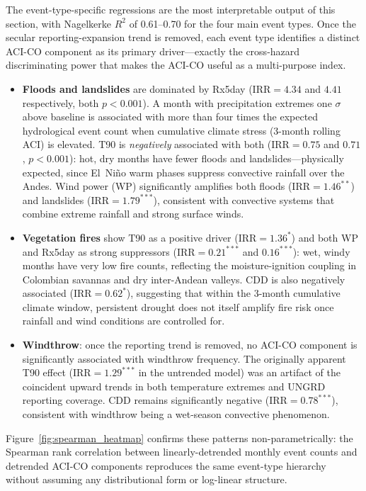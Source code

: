 \documentclass[12pt]{article}
\begin{document}
\medskip
The event-type-specific regressions are the most interpretable output of this section, with Nagelkerke $R^2$ of 0.61--0.70 for the four main event types. Once the secular reporting-expansion trend is removed, each event type identifies a distinct ACI-CO component as its primary driver---exactly the cross-hazard discriminating power that makes the ACI-CO useful as a multi-purpose index.

\begin{itemize}
\item \textbf{Floods and landslides} are dominated by Rx5day ($\mathrm{IRR}=4.34$ and $4.41$ respectively, both $p<0.001$). A month with precipitation extremes one $\sigma$ above baseline is associated with more than four times the expected hydrological event count when cumulative climate stress (3-month rolling ACI) is elevated. T90 is \emph{negatively} associated with both ($\mathrm{IRR}=0.75$ and $0.71$, $p<0.001$): hot, dry months have fewer floods and landslides---physically expected, since El~Ni\~no warm phases suppress convective rainfall over the Andes. Wind power (WP) significantly amplifies both floods ($\mathrm{IRR}=1.46^{**}$) and landslides ($\mathrm{IRR}=1.79^{***}$), consistent with convective systems that combine extreme rainfall and strong surface winds.

\item \textbf{Vegetation fires} show T90 as a positive driver ($\mathrm{IRR}=1.36^{*}$) and both WP and Rx5day as strong suppressors ($\mathrm{IRR}=0.21^{***}$ and $0.16^{***}$): wet, windy months have very low fire counts, reflecting the moisture-ignition coupling in Colombian savannas and dry inter-Andean valleys. CDD is also negatively associated ($\mathrm{IRR}=0.62^{*}$), suggesting that within the 3-month cumulative climate window, persistent drought does not itself amplify fire risk once rainfall and wind conditions are controlled for.

\item \textbf{Windthrow}: once the reporting trend is removed, no ACI-CO component is significantly associated with windthrow frequency. The originally apparent T90 effect ($\mathrm{IRR}=1.29^{***}$ in the untrended model) was an artifact of the coincident upward trends in both temperature extremes and UNGRD reporting coverage. CDD remains significantly negative ($\mathrm{IRR}=0.78^{***}$), consistent with windthrow being a wet-season convective phenomenon.
\end{itemize}

Figure~\ref{fig:spearman_heatmap} confirms these patterns non-parametrically: the Spearman rank correlation between linearly-detrended monthly event counts and detrended ACI-CO components reproduces the same event-type hierarchy without assuming any distributional form or log-linear structure.
\end{document}
